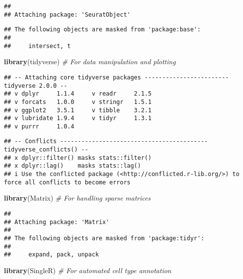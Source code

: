 \documentclass[
]{article}
\newenvironment{Shaded}{\begin{snugshade}}{\end{snugshade}}
\newcommand{\CommentTok}[1]{\textcolor[rgb]{0.56,0.35,0.01}{\textit{#1}}}
\newcommand{\FunctionTok}[1]{\textcolor[rgb]{0.13,0.29,0.53}{\textbf{#1}}}
\newcommand{\NormalTok}[1]{#1}
\begin{document}
\begin{verbatim}
## 
## Attaching package: 'SeuratObject'
\end{verbatim}

\begin{verbatim}
## The following objects are masked from 'package:base':
## 
##     intersect, t
\end{verbatim}

\begin{Shaded}
\begin{Highlighting}[]
\FunctionTok{library}\NormalTok{(tidyverse)      }\CommentTok{\# For data manipulation and plotting}
\end{Highlighting}
\end{Shaded}

\begin{verbatim}
## -- Attaching core tidyverse packages ------------------------ tidyverse 2.0.0 --
## v dplyr     1.1.4     v readr     2.1.5
## v forcats   1.0.0     v stringr   1.5.1
## v ggplot2   3.5.1     v tibble    3.2.1
## v lubridate 1.9.4     v tidyr     1.3.1
## v purrr     1.0.4
\end{verbatim}

\begin{verbatim}
## -- Conflicts ------------------------------------------ tidyverse_conflicts() --
## x dplyr::filter() masks stats::filter()
## x dplyr::lag()    masks stats::lag()
## i Use the conflicted package (<http://conflicted.r-lib.org/>) to force all conflicts to become errors
\end{verbatim}

\begin{Shaded}
\begin{Highlighting}[]
\FunctionTok{library}\NormalTok{(Matrix)         }\CommentTok{\# For handling sparse matrices}
\end{Highlighting}
\end{Shaded}

\begin{verbatim}
## 
## Attaching package: 'Matrix'
## 
## The following objects are masked from 'package:tidyr':
## 
##     expand, pack, unpack
\end{verbatim}

\begin{Shaded}
\begin{Highlighting}[]
\FunctionTok{library}\NormalTok{(SingleR)        }\CommentTok{\# For automated cell type annotation}
\end{Highlighting}
\end{Shaded}
\end{document}
